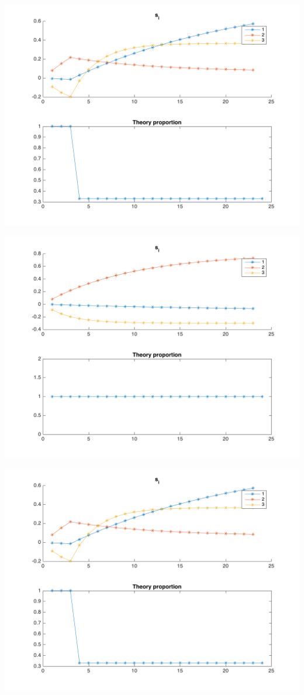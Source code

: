 \documentclass[11pt]{article}
\begin{document}
\begin{center}
\includegraphics[width=.9\linewidth]{./img/plan1.png}
\end{center}
\begin{center}
\includegraphics[width=.9\linewidth]{./img/plan2.png}
\end{center}
\begin{center}
\includegraphics[width=.9\linewidth]{./img/plan3.png}
\end{center}
\end{document}
